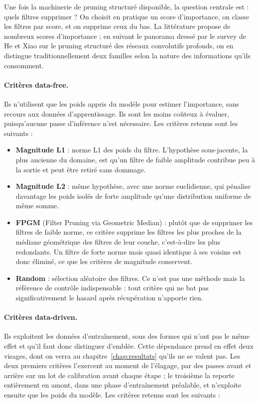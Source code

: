 \documentclass[11pt,a4paper]{report}
\begin{document}
Une fois la machinerie de pruning structuré disponible, la question centrale est : quels filtres supprimer ? On choisit en pratique un score d'importance, on classe les filtres par score, et on supprime ceux du bas. La littérature propose de nombreux scores d'importance ; en suivant le panorama dressé par le survey de He et Xiao \cite{heStructuredPruningDeep2024} sur le pruning structuré des réseaux convolutifs profonds, on en distingue traditionnellement deux familles selon la nature des informations qu'ils consomment.

\paragraph{Critères data-free.} Ils n'utilisent que les poids appris du modèle pour estimer l'importance, sans recours aux données d'apprentissage. Ils sont les moins coûteux à évaluer, puisqu'aucune passe d'inférence n'est nécessaire. Les critères retenus sont les suivants :

\begin{itemize}
  \item \textbf{Magnitude L1} : norme L1 des poids du filtre. L'hypothèse sous-jacente, la plus ancienne du domaine, est qu'un filtre de faible amplitude contribue peu à la sortie et peut être retiré sans dommage.
  \item \textbf{Magnitude L2} : même hypothèse, avec une norme euclidienne, qui pénalise davantage les poids isolés de forte amplitude qu'une distribution uniforme de même somme.
  \item \textbf{FPGM} (Filter Pruning via Geometric Median) : plutôt que de supprimer les filtres de faible norme, ce critère supprime les filtres les plus proches de la médiane géométrique des filtres de leur couche, c'est-à-dire les plus redondants. Un filtre de forte norme mais quasi identique à ses voisins est donc éliminé, ce que les critères de magnitude conservent.
  \item \textbf{Random} : sélection aléatoire des filtres. Ce n'est pas une méthode mais la référence de contrôle indispensable : tout critère qui ne bat pas significativement le hasard après récupération n'apporte rien.
\end{itemize}

\paragraph{Critères data-driven.} Ils exploitent les données d'entraînement, sous des formes qui n'ont pas le même effet et qu'il faut donc distinguer d'emblée. Cette dépendance prend en effet deux visages, dont on verra au chapitre~\ref{chap:resultats} qu'ils ne se valent pas. Les deux premiers critères l'exercent au moment de l'élagage, par des passes avant et arrière sur un lot de calibration avant chaque étape ; le troisième la reporte entièrement en amont, dans une phase d'entraînement préalable, et n'exploite ensuite que les poids du modèle. Les critères retenus sont les suivants :
\end{document}
